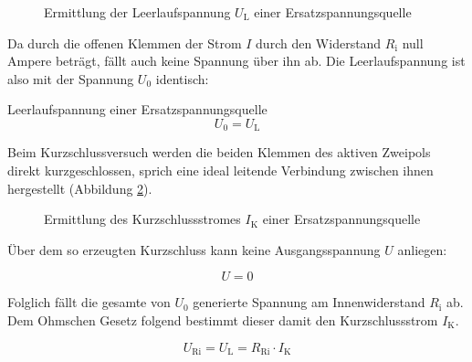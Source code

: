 \begin{frame}
{		\begin{figure}[h!]
			\begin{center}

				
			\end{center}
			\caption{Ermittlung der Leerlaufspannung $U_\mathrm{L}$ einer Ersatzspannungsquelle}
			\label{fig:leerlauf1}
			
			
		\end{figure}
		
		
		Da durch die offenen Klemmen der Strom $I$ durch den Widerstand $R_\mathrm{i}$ null Ampere beträgt, fällt auch keine Spannung über ihn ab.
		Die Leerlaufspannung ist also mit der Spannung $U_0$ identisch:
		
		\begin{Merksatz}{Leerlaufspannung einer Ersatzspannungsquelle}{}
			\begin{equation*}
				U_0 = U_\mathrm{L}
			\end{equation*}
		\end{Merksatz}
		
		Beim Kurzschlussversuch werden die beiden Klemmen des aktiven Zweipols direkt kurzgeschlossen, sprich eine
		ideal leitende Verbindung zwischen ihnen hergestellt (Abbildung \ref{fig:kurzschluss1}).
		
		
		\begin{figure}[h!]
			\begin{center}

				
			\end{center}
			\caption{Ermittlung des Kurzschlussstromes $I_\mathrm{K}$ einer Ersatzspannungsquelle}
			\label{fig:kurzschluss1}
			
			
		\end{figure}
		
		Über dem so erzeugten Kurzschluss kann keine Ausgangsspannung $U$ anliegen:
		
		\begin{equation*}
			U = 0
		\end{equation*}
		
		Folglich fällt die gesamte von $U_0$ generierte Spannung am Innenwiderstand $R_\mathrm{i}$ ab.
		Dem Ohmschen Gesetz folgend bestimmt dieser damit den Kurzschlussstrom $I_\mathrm{K}$. 
		
		\begin{equation*}
			U_\mathrm{Ri} = U_\mathrm{L} =R_\mathrm{Ri} \cdot I_\mathrm{K}
		\end{equation*}
		
}
\end{frame}
